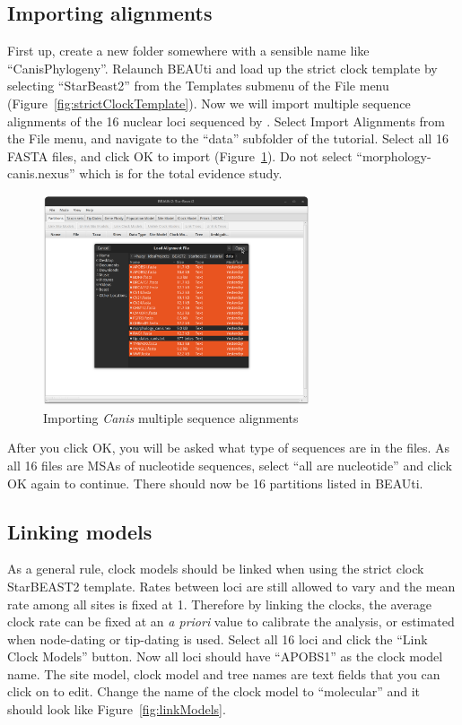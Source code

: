 \documentclass[12pt]{article}
\begin{document}
\subsection{Importing alignments}
\label{subsec:importingAlignments}

First up, create a new folder somewhere with a sensible name like
``CanisPhylogeny''. Relaunch BEAUti and load up the strict clock
template by selecting ``StarBeast2'' from the Templates submenu of the File menu
(Figure~\ref{fig:strictClockTemplate}). Now we will import multiple sequence
alignments of the 16 nuclear loci sequenced by \cite{LindbladToh2005}. Select
Import Alignments from the File menu, and navigate to the ``data'' subfolder
of the tutorial. Select all 16 FASTA files, and click OK to import
(Figure~\ref{fig:fastaFileImport}). Do not select ``morphology-canis.nexus''
which is for the total evidence study.

\begin{figure}[htb!]
\centering
\includegraphics[width=0.7\textwidth]{figures/fastaFileImport.png}
\caption
{Importing \textit{Canis} multiple sequence alignments}
\label{fig:fastaFileImport}
\end{figure}

After you click OK, you will be asked what type of sequences are in the files.
As all 16 files are MSAs of nucleotide sequences, select ``all are nucleotide''
and click OK again to continue. There should now be 16 partitions listed in
BEAUti.

\subsection{Linking models}
\label{subsec:linkingModels}

As a general rule, clock models should be linked when using the strict clock StarBEAST2 template. Rates between
loci are still allowed to vary and the mean rate among all sites is fixed at 1. Therefore
by linking the clocks, the average clock rate can be fixed at an \textit{a priori} value
to calibrate the analysis, or estimated when node-dating or tip-dating is used.
Select all 16 loci and click the ``Link Clock Models'' button. Now all loci
should have ``APOBS1'' as the clock model name. The site model, clock model and tree names are text fields that you can click on to edit. Change the name of the clock model to ``molecular'' and it should look like Figure~\ref{fig:linkModels}.
\end{document}
